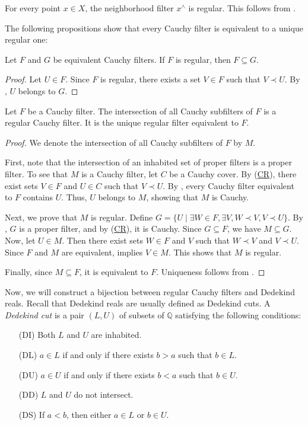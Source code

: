 \documentclass[reqno]{amsart}
\newcommand{\axitem}[1]{\phantomsection \label{ax:#1}}
\newcommand{\axref}[1]{(\hyperref[ax:#1]{#1})}
\theoremstyle{definition}
\theoremstyle{remark}
\numberwithin{figure}{section}
\newcommand{\rb}{\prec}
\begin{document}
\begin{example}
For every point $x \in X$, the neighborhood filter $x^\wedge$ is regular.
This follows from .
\end{example}

The following propositions show that every Cauchy filter is equivalent to a unique regular one:

\begin{prop}
Let $F$ and $G$ be equivalent Cauchy filters.
If $F$ is regular, then $F \subseteq G$.
\end{prop}
\begin{proof}
Let $U \in F$.
Since $F$ is regular, there exists a set $V \in F$ such that $V \rb U$.
By , $U$ belongs to $G$.
\end{proof}

\begin{prop}
Let $F$ be a Cauchy filter.
The intersection of all Cauchy subfilters of $F$ is a regular Cauchy filter.
It is the unique regular filter equivalent to $F$.
\end{prop}
\begin{proof}
We denote the intersection of all Cauchy subfilters of $F$ by $M$.

First, note that the intersection of an inhabited set of proper filters is a proper filter.
To see that $M$ is a Cauchy filter, let $C$ be a Cauchy cover.
By \axref{CR}, there exist sets $V \in F$ and $U \in C$ such that $V \rb U$.
By , every Cauchy filter equivalent to $F$ contains $U$.
Thus, $U$ belongs to $M$, showing that $M$ is Cauchy.

Next, we prove that $M$ is regular.
Define $G = \{ U \mid \exists W \in F, \exists V, W \rb V, V \rb U \}$.
By , $G$ is a proper filter, and by \axref{CR}, it is Cauchy.
Since $G \subseteq F$, we have $M \subseteq G$.
Now, let $U \in M$.
Then there exist sets $W \in F$ and $V$ such that $W \rb V$ and $V \rb U$.
Since $F$ and $M$ are equivalent,  implies $V \in M$.
This shows that $M$ is regular.

Finally, since $M \subseteq F$, it is equivalent to $F$.
Uniqueness follows from .
\end{proof}

Now, we will construct a bijection between regular Cauchy filters and Dedekind reals.
Recall that Dedekind reals are usually defined as Dedekind cuts.
A \emph{Dedekind cut} is a pair $(L,U)$ of subsets of $\mathbb{Q}$ satisfying the following conditions:
\begin{itemize}
\item[(DI)] \axitem{DI} Both $L$ and $U$ are inhabited.
\item[(DL)] \axitem{DL} $a \in L$ if and only if there exists $b > a$ such that $b \in L$.
\item[(DU)] \axitem{DU} $a \in U$ if and only if there exists $b < a$ such that $b \in U$.
\item[(DD)] \axitem{DD} $L$ and $U$ do not intersect.
\item[(DS)] \axitem{DS} If $a < b$, then either $a \in L$ or $b \in U$.
\end{itemize}
\end{document}
